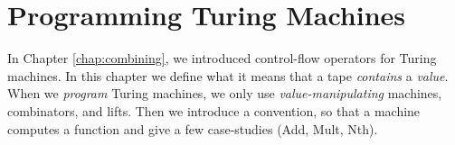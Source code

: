 \chapter{Programming Turing Machines}
\label{chap:programming}

In Chapter \ref{chap:combining}, we introduced control-flow operators for Turing machines.
In this chapter we define what it means that a tape \emph{contains} a \emph{value}.
When we \emph{program} Turing machines, we only use \emph{value-manipulating} machines, combinators, and lifts.
Then we introduce a convention, so that a machine computes a function and give a few case-studies (Add, Mult, Nth).

